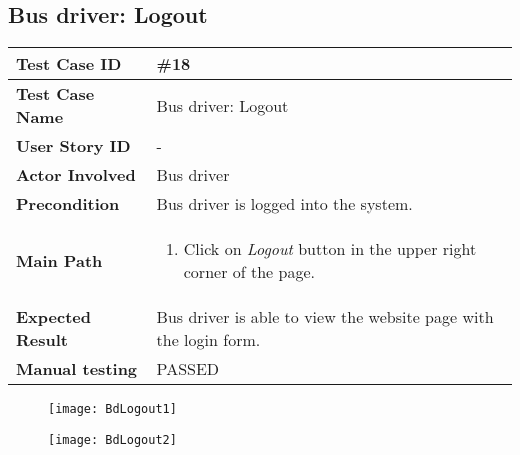 \subsection{Bus driver: Logout}
\begin{center}
	\begin{tabular} { | m{3.5cm} | m{9.5cm} | }
		\hline
		\textbf{Test Case ID} & \#18\\
		\hline
		\textbf{Test Case Name} & Bus driver: Logout\\
		\hline
		\textbf{User Story ID} & - \\
		\hline
		\textbf{Actor Involved} & Bus driver\\
		\hline
		\textbf{Precondition} & Bus driver is logged into the system.\\
		\hline
		\textbf{Main Path} & 
		\begin{enumerate}
			\item Click on \textit{Logout} button in the upper right corner of the page.
		\end{enumerate}\\
		\hline
		\textbf{Expected Result} & Bus driver is able to view the website page with the login form.\\
		\hline
	\textbf{Manual testing} & PASSED\\
	\hline
\end{tabular}
\end{center}
\begin{figure}[H]
\centering
\texttt{[image: BdLogout1]}
\end{figure}
\begin{figure}[H]
\centering
\texttt{[image: BdLogout2]}
\end{figure}
\newpage
